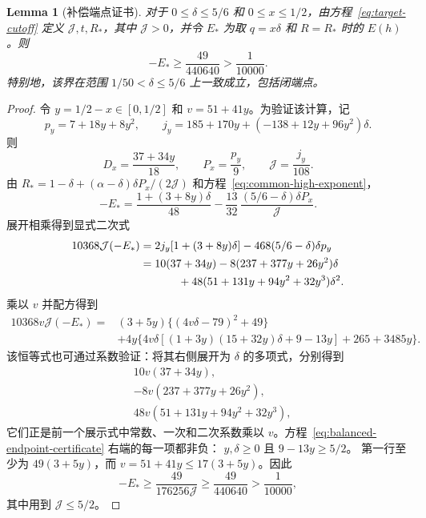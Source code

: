 \documentclass[11pt,a4paper]{article}
\numberwithin{equation}{section}
\numberwithin{figure}{section}
\newtheorem{lemma}[theorem]{Lemma}
\theoremstyle{definition}
\theoremstyle{remark}
\begin{document}
\begin{lemma}[补偿端点证书]\label{lem:balanced-endpoint}
对于 \(0\le\delta\le5/6\) 和 \(0\le x\le1/2\)，由方程~\eqref{eq:target-cutoff} 定义 \(\mathcal J,t,R_*\)，其中 \(\mathcal J>0\)，并令 \(E_*\) 为取 \(q=x\delta\) 和 \(R=R_*\) 时的 \(E(h)\)。则
\[
 -E_*\ge\frac{49}{440640}>\frac1{10000}.
\]
特别地，该界在范围 \(1/50<\delta\le5/6\) 上一致成立，包括闭端点。
\end{lemma}

\begin{proof}
令 \(y=1/2-x\in[0,1/2]\) 和 \(v=51+41y\)。为验证该计算，记
\[
 p_y=7+18y+8y^2,\qquad
 j_y=185+170y+(-138+12y+96y^2)\delta.
\]
则
\[
 D_x=\frac{37+34y}{18},\qquad
 P_x=\frac{p_y}{9},\qquad
 \mathcal J=\frac{j_y}{108}.
\]
由 \(R_*=1-\delta+(\alpha-\delta)\delta P_x/(2\mathcal J)\) 和方程~\eqref{eq:common-high-exponent}，
\[
 -E_*=
 \frac{1+(3+8y)\delta}{48}
 -\frac{13}{32}\,
   \frac{(5/6-\delta)\delta P_x}{\mathcal J}.
\]
展开相乘得到显式二次式
\[
 \begin{split}
 10368\mathcal J(-E_*)
 &=2j_y[1+(3+8y)\delta]
     -468(5/6-\delta)\delta p_y\\
 &=10(37+34y)
   -8(237+377y+26y^2)\delta\\
 &\hspace{12mm}
   +48(51+131y+94y^2+32y^3)\delta^2.
 \end{split}
\]
乘以 \(v\) 并配方得到
\begin{equation}
 \begin{aligned}
 10368v\mathcal J(-E_*)
 ={}&(3+5y)\bigl\{(4v\delta-79)^2+49\bigr\}\\
 &+4y\bigl\{
 4v\delta[(1+3y)(15+32y)\delta+9-13y]
       +265+3485y\bigr\}.
 \end{aligned}
 \label{eq:balanced-endpoint-certificate}
\end{equation}
该恒等式也可通过系数验证：将其右侧展开为 \(\delta\) 的多项式，分别得到
\[
 \begin{split}
 &10v(37+34y),\\
 &-8v(237+377y+26y^2),\\
 &48v(51+131y+94y^2+32y^3),
 \end{split}
\]
它们正是前一个展示式中常数、一次和二次系数乘以 \(v\)。方程~\eqref{eq:balanced-endpoint-certificate} 右端的每一项都非负：
\(y,\delta\ge0\) 且 \(9-13y\ge5/2\)。
第一行至少为 \(49(3+5y)\)，而
\(v=51+41y\le17(3+5y)\)。因此
\[
 -E_*\ge\frac{49}{176256\mathcal J}
       \ge\frac{49}{440640}>\frac1{10000},
\]
其中用到 \(\mathcal J\le5/2\)。
\end{proof}
\end{document}
